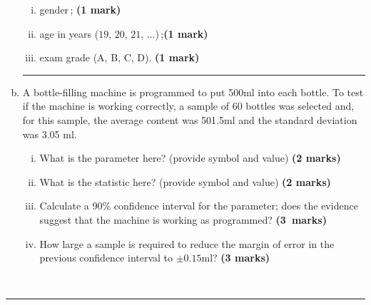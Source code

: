 \documentclass[12pt]{article}
\begin{document}
\begin{enumerate}[a)]
\begin{enumerate}[i)]
    \item gender\,; \hfill{\scriptsize \bf (1 mark)}
    \item age in years  ($19$, $20$, $21$, $\ldots$)\,;\hfill{\scriptsize \bf (1 mark)}
    \item exam grade (A, B, C, D). \hfill{\scriptsize \bf (1 mark)}
    \end{enumerate}
    \begin{center}\noindent\rule{0.4\linewidth}{0.5pt}\end{center}
\item A bottle-filling machine is programmed to put 500ml into each bottle. To test if the machine is working correctly, a sample of 60 bottles was selected and, for this sample, the average content was 501.5ml and the standard deviation was 3.05 ml.
    \begin{enumerate}[i)]\itemsep0.3cm
    \item What is the parameter here? (provide symbol and value) \hfill{\scriptsize \bf (2 marks)}
    \item What is the statistic here? (provide symbol and value) \hfill{\scriptsize \bf (2 marks)}
    \item Calculate a 90\% confidence interval for the parameter; does the evidence suggest that the machine is working as programmed? \hfill{\mbox{\scriptsize \bf (3 marks)}}
    \item How large a sample is required to reduce the margin of error in the previous confidence interval to $\pm0.15$ml? \hfill{\scriptsize \bf (3 marks)}
    \end{enumerate}
\end{enumerate}
\quad\\[-0.3cm]
\noindent\rule{\linewidth}{1pt}

\newpage
\end{document}
